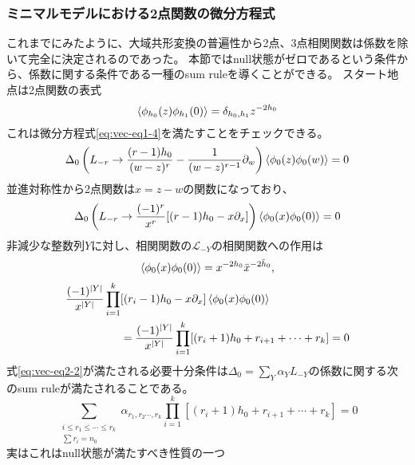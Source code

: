 \documentclass[11pt, aps, longbibliography]{article}
\numberwithin{equation}{section}
\begin{document}
        \subsubsection{ミニマルモデルにおける2点関数の微分方程式}
        これまでにみたように、大域共形変換の普遍性から2点、3点相関関数は係数を除いて完全に決定されるのであった。
        本節ではnull状態がゼロであるという条件から、係数に関する条件である一種のsum ruleを導くことができる。
        スタート地点は2点関数の表式
        \begin{equation}\label{eq:vec-eq2-1}
            \expval{\phi_{h_0}(z)\phi_{h_1}(0)} = \delta_{h_0,h_1}z^{-2h_0}
        \end{equation}
        これは微分方程式\eqref{eq:vec-eq1-4}を満たすことをチェックできる。
        \begin{equation}\label{eq:vec-eq2-2}
            \Delta_0 \left( L_{-r} \rightarrow \frac{(r-1)h_0}{(w-z)^r} - \frac{1}{(w-z)^{r-1}}\partial_w \right) \expval{\phi_0(z)\phi_0(w)} = 0
        \end{equation}
        並進対称性から2点関数は$x=z-w$の関数になっており、
        \begin{equation}\label{eq:vec-eq2-3}
            \Delta_0 \left( L_{-r} \rightarrow \frac{(-1)^r}{x^r} [(r-1)h_0 - x\partial_x] \right) \expval{\phi_0(x)\phi_0(0)} = 0
        \end{equation}
        非減少な整数列$Y$に対し、相関関数の$\mathcal{L}_{-Y}$の相関関数への作用は
        \begin{equation}\label{eq:vec-eq2-4}
            \expval{\phi_0(x)\phi_0(0)} = x^{-2h_0}\bar{x}^{-2\bar{h}_0},
        \end{equation}
        \begin{align}\label{eq:vec-eq2-5}
            \frac{(-1)^{|Y|}}{x^{|Y|}}\prod_{i=1}^{k}&[(r_i-1)h_0 -x\partial_x]\expval{\phi_0(x)\phi_0(0)} \notag \\
            &=\frac{(-1)^{|Y|}}{x^{|Y|}}\prod_{i=1}^{k}[(r_i+1)h_0 + r_{i+1}+\cdots +r_k] = 0
        \end{align}
        式\eqref{eq:vec-eq2-2}が満たされる必要十分条件は$\Delta_0=\sum_Y \alpha_Y L_{-Y}$の係数に関する次のsum ruleが満たされることである。
        \begin{equation}\label{eq:vec-eq2-6}
            \sum_{\substack{i\leq r_1\leq\cdots \leq r_k \\ \sum r_i=n_0}}\alpha_{r_1,r_2\cdots,r_k} \prod_{i=1}^k [(r_i+1)h_0 + r_{i+1} + \cdots + r_k] = 0
        \end{equation}
        実はこれはnull状態が満たすべき性質の一つ
\end{document}
